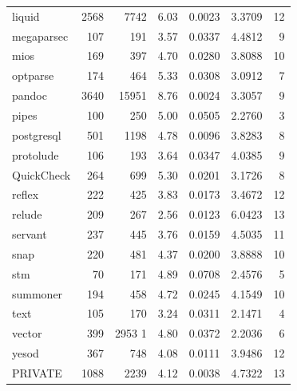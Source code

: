 \documentclass[12pt, a4paper]{article}
\begin{document}
\begin{longtable}[H]{l r r r r r r}
        liquid    & 2568 &  7742  & 6.03 & 0.0023 & 3.3709 & 12 \\      
        megaparsec&  107 &   191  & 3.57 & 0.0337 & 4.4812 &  9 \\      
        mios      &  169 &   397  & 4.70 & 0.0280 & 3.8088 & 10 \\      
        optparse  &  174 &   464  & 5.33 & 0.0308 & 3.0912 &  7 \\      
        pandoc    & 3640 & 15951  & 8.76 & 0.0024 & 3.3057 &  9 \\      
        pipes     &  100 &   250  & 5.00 & 0.0505 & 2.2760 &  3 \\      
        postgresql&  501 &  1198  & 4.78 & 0.0096 & 3.8283 &  8 \\      
        protolude &  106 &   193  & 3.64 & 0.0347 & 4.0385 &  9 \\      
        QuickCheck&  264 &   699  & 5.30 & 0.0201 & 3.1726 &  8 \\      
        reflex    &  222 &   425  & 3.83 & 0.0173 & 3.4672 & 12 \\      
        relude    &  209 &   267  & 2.56 & 0.0123 & 6.0423 & 13 \\      
        servant   &  237 &   445  & 3.76 & 0.0159 & 4.5035 & 11 \\      
        snap      &  220 &   481  & 4.37 & 0.0200 & 3.8888 & 10 \\      
        stm       &   70 &   171  & 4.89 & 0.0708 & 2.4576 &  5 \\      
        summoner  &  194 &   458  & 4.72 & 0.0245 & 4.1549 & 10 \\      
        text      &  105 &   170  & 3.24 & 0.0311 & 2.1471 &  4 \\      
        vector    &  399 &  2953 1& 4.80 & 0.0372 & 2.2036 &  6 \\      
        yesod     &  367 &   748  & 4.08 & 0.0111 & 3.9486 & 12 \\     
        PRIVATE   & 1088 &   2239 &  4.12&  0.0038&  4.7322&  13 
\end{longtable}
\end{document}
